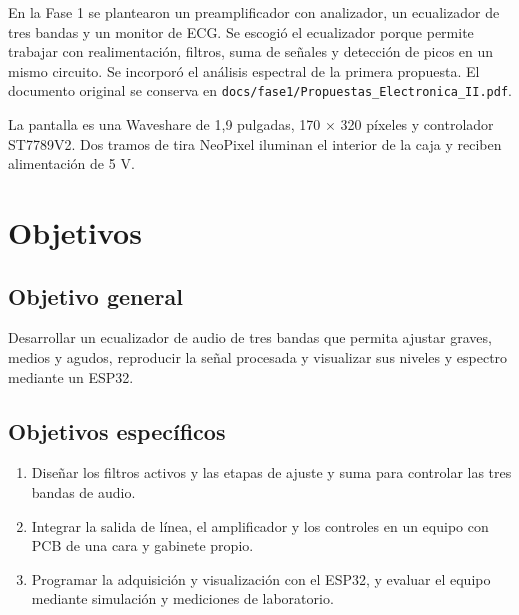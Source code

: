 \documentclass[11pt,a4paper]{article}
\begin{document}
En la Fase 1 se plantearon un preamplificador con analizador, un ecualizador de tres bandas y un monitor de ECG. Se escogió el ecualizador porque permite trabajar con realimentación, filtros, suma de señales y detección de picos en un mismo circuito. Se incorporó el análisis espectral de la primera propuesta. El documento original se conserva en \texttt{docs/fase1/Propuestas\_Electronica\_II.pdf}.

La pantalla es una Waveshare de 1,9 pulgadas, 170 × 320 píxeles y controlador ST7789V2. Dos tramos de tira NeoPixel iluminan el interior de la caja y reciben alimentación de 5 V.

\section{Objetivos}
\subsection{Objetivo general}
Desarrollar un ecualizador de audio de tres bandas que permita ajustar graves, medios y agudos, reproducir la señal procesada y visualizar sus niveles y espectro mediante un ESP32.
\subsection{Objetivos específicos}
\begin{enumerate}
\item Diseñar los filtros activos y las etapas de ajuste y suma para controlar las tres bandas de audio.
\item Integrar la salida de línea, el amplificador y los controles en un equipo con PCB de una cara y gabinete propio.
\item Programar la adquisición y visualización con el ESP32, y evaluar el equipo mediante simulación y mediciones de laboratorio.
\end{enumerate}
\end{document}
